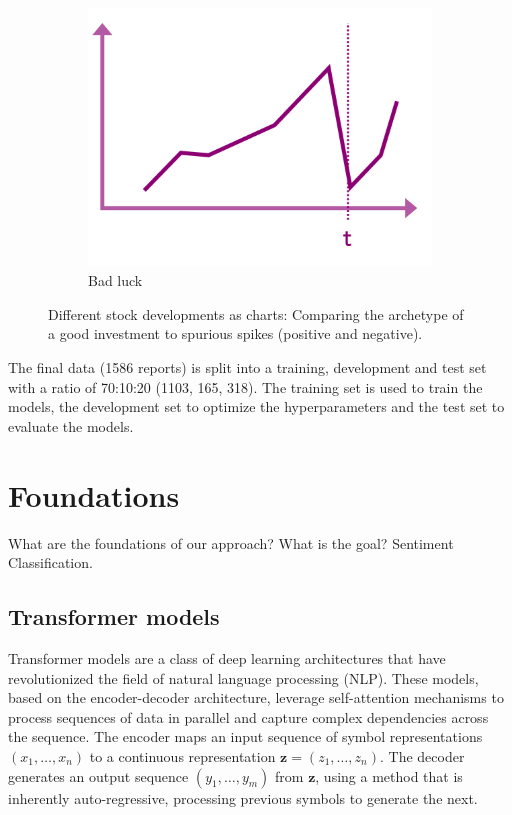 \documentclass[conference]{IEEEtran}
\begin{document}
\begin{figure}[h!]
\begin{subfigure}{.33\linewidth}
        \centering
        \includegraphics[width=\linewidth]{../5. report/pictures/preproccessing3.png}
        \caption{Bad luck}
        \label{fig:preprocessing3}
    \end{subfigure}
    \caption{Different stock developments as charts: Comparing the archetype of a good investment to spurious spikes (positive and negative). }
    \label{fig:preprocessing}
\end{figure}

The final data (1586 reports) is split into a training, development and test set with a ratio of 70:10:20 (1103, 165, 318). The training set is used to train the models, the development set to optimize the hyperparameters and the test set to evaluate the models. 
\section{Foundations} %
What are the foundations of our approach? What is the goal? Sentiment Classification. \cite{Vaswani2023}

\subsection{Transformer models}%
Transformer models are a class of deep learning architectures that have revolutionized the field of natural language processing (NLP). These models, based on the encoder-decoder architecture, leverage self-attention mechanisms to process sequences of data in parallel and capture complex dependencies across the sequence. The encoder maps an input sequence of symbol representations $(x_1, \ldots, x_n)$ to a continuous representation $\mathbf{z}=(z_1, \ldots, z_n)$. The decoder generates an output sequence $(y_1, \ldots, y_m)$ from $\mathbf{z}$, using a method that is inherently auto-regressive, processing previous symbols to generate the next.
\end{document}
